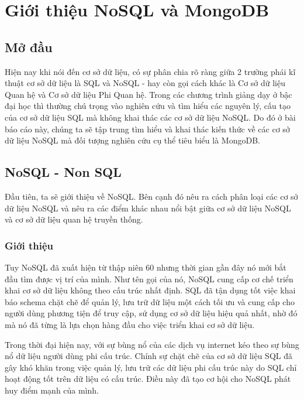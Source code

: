 \chapter{Giới thiệu NoSQL và MongoDB}
\section{Mở đầu}
Hiện nay khi nói đến cơ sở dữ liệu, có sự phân chia rõ ràng giữa 2 trường phái kĩ thuật cơ sở dữ liệu là SQL và NoSQL - hay còn gọi cách khác là Cơ sở dữ liệu Quan hệ và Cơ sở dữ liệu Phi Quan hệ. Trong các chương trình giảng dạy ở bậc đại học thì thường chú trọng vào nghiên cứu và tìm hiểu các nguyên lý, cấu tạo của cơ sở dữ liệu SQL mà không khai thác các cơ sở dữ liệu NoSQL. Do đó ở bài báo cáo này, chúng ta sẽ tập trung tìm hiểu và khai thác kiến thức về các cơ sở dữ liệu NoSQL mà đối tượng nghiên cứu cụ thể tiêu biểu là MongoDB.

\section{NoSQL - Non SQL}
Đầu tiên, ta sẽ giới thiệu về NoSQL. Bên cạnh đó nêu ra cách phân loại các cơ sở dữ liệu NoSQL và nêu ra các điểm khác nhau nổi bật giữa cơ sở dữ liệu NoSQL và cơ sở dữ liệu quan hệ truyền thống.
\subsection{Giới thiệu}
Tuy NoSQL đã xuất hiện từ thập niên 60 nhưng thời gian gần đây nó mới bắt đầu tìm được vị trí của mình. Như tên gọi của nó, NoSQL cung cấp cơ chế triển khai cơ sở dữ liệu không theo cấu trúc nhất định. SQL đã tận dụng tốt việc khai báo schema chặt chẽ để quản lý, lưu trữ dữ liệu một cách tối ưu và cung cấp cho người dùng phương tiện để truy cập, sử dụng cơ sở dữ liệu hiệu quả nhất, nhờ đó mà nó đã từng là lựa chọn hàng đầu cho việc triển khai cơ sở dữ liệu.

Trong thời đại hiện nay, với sự bùng nổ của các dịch vụ internet kéo theo sự bùng nổ dữ liệu người dùng phi cấu trúc. Chính sự chặt chẽ của cơ sở dữ liệu SQL đã gây khó khăn trong việc quản lý, lưu trữ các dữ liệu phi cấu trúc này do SQL chỉ hoạt động tốt trên dữ liệu có cấu trúc. Điều này đã tạo cơ hội cho NoSQL phát huy điểm mạnh của mình.
